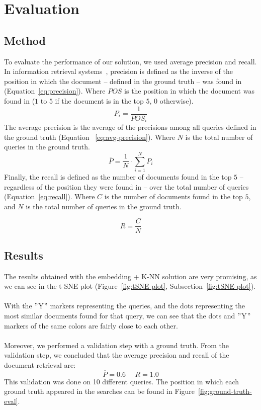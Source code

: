 \section{Evaluation}\label{sec:preliminary-evaluation}

\subsection{Method}\label{subsec:method}
To evaluate the performance of our solution, we used average precision and recall.
In information retrieval systems~\cite{canamares_offline_2020}, precision is defined as the inverse of the position in which the document -- defined in the ground truth -- was found in (Equation~\ref{eq:precision}).
Where $POS$ is the position in which the document was found in ($1$ to $5$ if the document is in the top $5$, $0$ otherwise).
\begin{equation}
    P_i = \frac{1}{POS_i}
    \label{eq:precision}
\end{equation}
The average precision is the average of the precisions among all queries defined in the ground truth (Equation ~\ref{eq:avg-precision}).
Where $N$ is the total number of queries in the ground truth.
\begin{equation}
    \overline{P} = \frac{1}{N} \cdot \sum^N_{i=1}P_i
    \label{eq:avg-precision}
\end{equation}
Finally, the recall is defined as the number of documents found in the top $5$ -- regardless of the position they were found in -- over the total number of queries (Equation~\ref{eq:recall}).
Where $C$ is the number of documents found in the top $5$, and $N$ is the total number of queries in the ground truth.

\begin{equation}
    R = \frac{C}{N}
    \label{eq:recall}
\end{equation}

\subsection{Results}\label{subsec:results}
The results obtained with the embedding + K-NN solution are very promising, as we can see in the t-SNE plot (Figure~\ref{fig:tSNE-plot}, Subsection~\ref{fig:tSNE-plot}). \\ \\
With the \("\)Y\("\) markers representing the queries, and the dots representing the most similar documents found for that query, we can see that the dots and \("\)Y\("\) markers of the same colors are fairly close to each other. \\ \\
Moreover, we performed a validation step with a ground truth.
From the validation step, we concluded that the average precision and recall of the document retrieval are:
\[\overline{P} = 0.6 ~~~~~~ R = 1.0\]
This validation was done on 10 different queries.
The position in which each ground truth appeared in the searches can be found in Figure~\ref{fig:ground-truth-eval}.

